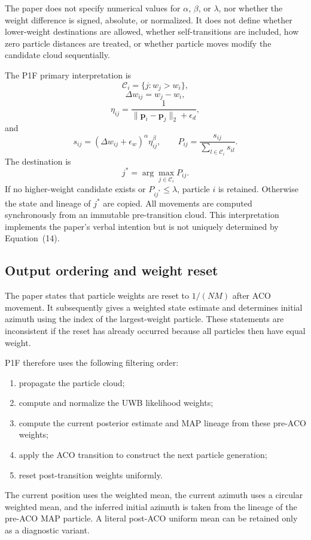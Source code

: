 The paper does not specify numerical values for $\alpha$, $\beta$, or $\lambda$, nor whether the weight difference is signed, absolute, or normalized. It does not define whether lower-weight destinations are allowed, whether self-transitions are included, how zero particle distances are treated, or whether particle moves modify the candidate cloud sequentially.

The P1F primary interpretation is
\begin{equation}
    \mathcal C_i=\{j:w_j>w_i\},
\end{equation}
\begin{equation}
    \Delta w_{ij}=w_j-w_i,
\end{equation}
\begin{equation}
    \eta_{ij}=\frac{1}{\lVert\bm p_i-\bm p_j\rVert_2+\epsilon_d},
\end{equation}
and
\begin{equation}
    s_{ij}=(\Delta w_{ij}+\epsilon_w)^\alpha\eta_{ij}^{\beta},
    \qquad
    P_{ij}=\frac{s_{ij}}{\sum_{l\in\mathcal C_i}s_{il}}.
\end{equation}
The destination is
\begin{equation}
    j^*=\arg\max_{j\in\mathcal C_i}P_{ij}.
\end{equation}
If no higher-weight candidate exists or $P_{ij^*}\le\lambda$, particle $i$ is retained. Otherwise the state and lineage of $j^*$ are copied. All movements are computed synchronously from an immutable pre-transition cloud. This interpretation implements the paper's verbal intention but is not uniquely determined by Equation~(14).

\subsection{Output ordering and weight reset}
The paper states that particle weights are reset to $1/(NM)$ after ACO movement. It subsequently gives a weighted state estimate and determines initial azimuth using the index of the largest-weight particle. These statements are inconsistent if the reset has already occurred because all particles then have equal weight.

P1F therefore uses the following filtering order:
\begin{enumerate}
    \item propagate the particle cloud;
    \item compute and normalize the UWB likelihood weights;
    \item compute the current posterior estimate and MAP lineage from these pre-ACO weights;
    \item apply the ACO transition to construct the next particle generation;
    \item reset post-transition weights uniformly.
\end{enumerate}
The current position uses the weighted mean, the current azimuth uses a circular weighted mean, and the inferred initial azimuth is taken from the lineage of the pre-ACO MAP particle. A literal post-ACO uniform mean can be retained only as a diagnostic variant.

